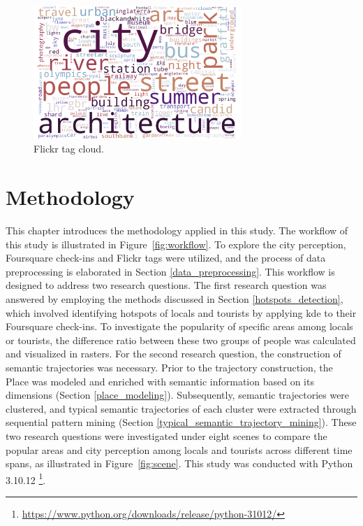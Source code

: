 \documentclass{article}
\theoremstyle{remark}
\begin{document}
\begin{figure}[h!]
\centering
\includegraphics[width=0.7\textwidth]{figures/flickr_tag_cloud.png}
\caption{\label{fig:flickr_tag_cloud}Flickr tag cloud.}
\end{figure}


\clearpage


\section{Methodology}

This chapter introduces the methodology applied in this study. The workflow of this study is illustrated in Figure~\ref{fig:workflow}. To explore the city perception, Foursquare check-ins and Flickr tags were utilized, and the process of data preprocessing is elaborated in Section \ref{data_preprocessing}. This workflow is designed to address two research questions. The first research question was answered by employing the methods discussed in Section \ref{hotspots_detection}, which involved identifying hotspots of locals and tourists by applying \acrfull{kde} to their Foursquare check-ins. To investigate the popularity of specific areas among locals or tourists, the difference ratio between these two groups of people was calculated and visualized in rasters. For the second research question, the construction of semantic trajectories was necessary. Prior to the trajectory construction, the Place was modeled and enriched with semantic information based on its dimensions (Section \ref{place_modeling}). Subsequently, semantic trajectories were clustered, and typical semantic trajectories of each cluster were extracted through sequential pattern mining (Section \ref{typical_semantic_trajectory_mining}). These two research questions were investigated under eight scenes to compare the popular areas and city perception among locals and tourists across different time spans, as illustrated in Figure~\ref{fig:scene}. This study was conducted with Python 3.10.12 \footnote{\url{https://www.python.org/downloads/release/python-31012/}}.
\end{document}
